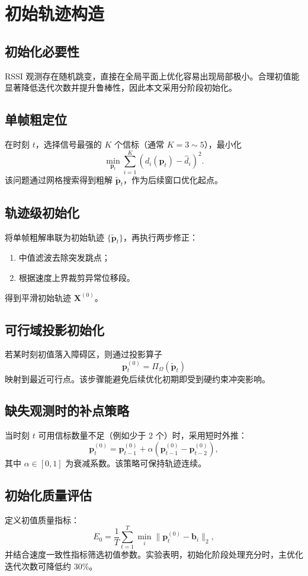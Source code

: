 \chapter{初始轨迹构造}

\section{初始化必要性}
RSSI 观测存在随机跳变，直接在全局平面上优化容易出现局部极小。合理初值能显著降低迭代次数并提升鲁棒性，因此本文采用分阶段初始化。

\section{单帧粗定位}
在时刻 $t$，选择信号最强的 $K$ 个信标（通常 $K=3\sim5$），最小化
\[
\min_{\bm p_t}\sum_{i=1}^{K}\left(d_i(\bm p_t)-\hat d_i\right)^2.
\]
该问题通过网格搜索得到粗解 $\tilde{\bm p}_t$，作为后续窗口优化起点。

\section{轨迹级初始化}
将单帧粗解串联为初始轨迹 $\{\tilde{\bm p}_t\}$，再执行两步修正：
\begin{enumerate}
  \item 中值滤波去除突发跳点；
  \item 根据速度上界裁剪异常位移段。
\end{enumerate}
得到平滑初始轨迹 $\bm X^{(0)}$。

\section{可行域投影初始化}
若某时刻初值落入障碍区，则通过投影算子
\[
\bm p_t^{(0)}=\Pi_{\Omega}(\tilde{\bm p}_t)
\]
映射到最近可行点。该步骤能避免后续优化初期即受到硬约束冲突影响。

\section{缺失观测时的补点策略}
当时刻 $t$ 可用信标数量不足（例如少于 2 个）时，采用短时外推：
\[
\bm p_t^{(0)}=\bm p_{t-1}^{(0)}+\alpha(\bm p_{t-1}^{(0)}-\bm p_{t-2}^{(0)}),
\]
其中 $\alpha\in[0,1]$ 为衰减系数。该策略可保持轨迹连续。

\section{初始化质量评估}
定义初值质量指标：
\[
E_0=\frac{1}{T}\sum_{t=1}^{T}\min_i\|\bm p_t^{(0)}-\bm b_i\|_2,
\]
并结合速度一致性指标筛选初值参数。实验表明，初始化阶段处理充分时，主优化迭代次数可降低约 30\%。
